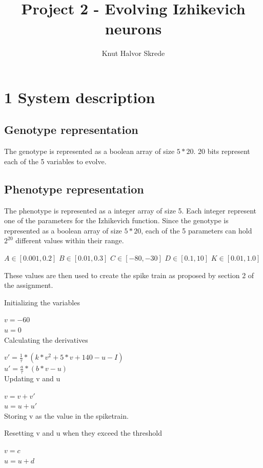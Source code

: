 \documentclass[11pt]{article}
\title{Project 2 - Evolving Izhikevich neurons}
\author{Knut Halvor Skrede}
\begin{document}
\maketitle

\section*{1 System description}

\subsection*{Genotype representation}

The genotype is represented as a boolean array of size $5*20$. 20 bits represent each of the
5 variables to evolve.

\subsection*{Phenotype representation}

The phenotype is represented as a integer array of size 5. Each integer represent one of the
parameters for the Izhikevich function. Since the genotype is represented as a boolean array of
size $5*20$, each of the 5 parameters can hold $2^{20}$ different values within their range.

$A \in [0.001, 0.2]$ $B \in [0.01, 0.3]$ $C \in [−80, −30]$ $D \in [0.1, 10]$ $K \in [0.01, 1.0]$

These values are then used to create the spike train as proposed by section 2 of the assignment.

Initializing the variables

$v = -60$\\
$u = 0$\\

Calculating the derivatives

$v' = \frac{1}{\tau}*(k*v^2 + 5*v +140 - u -I)$\\
$u' = \frac{a}{\tau}*(b*v - u)$\\

Updating v and u

$v = v+v'$\\
$u = u+u'$\\

Storing v as the value in the spiketrain.

Resetting v and u when they exceed the threshold

$v = c$\\
$u = u+d$\\
\end{document}
